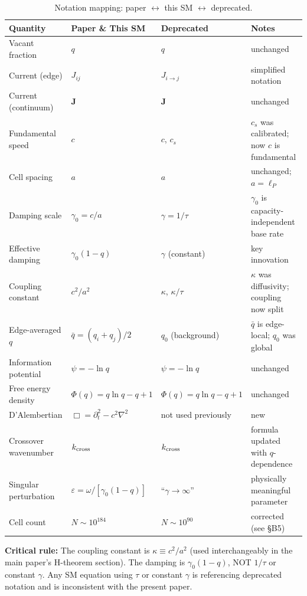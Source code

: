 \documentclass[reprint]{revtex4-2}
\begin{document}
\begin{table}[h]
\caption{Notation mapping: paper $\leftrightarrow$ this SM $\leftrightarrow$ deprecated.}
\label{tab:notation}
\begin{tabular}{llll}
\toprule
Quantity & Paper \& This SM & Deprecated & Notes \\
\midrule
Vacant fraction & $q$ & $q$ & unchanged \\
Current (edge) & $J_{ij}$ & $J_{i\to j}$ & simplified notation \\
Current (continuum) & $\mathbf{J}$ & $\mathbf{J}$ & unchanged \\
Fundamental speed & $c$ & $c$, $c_s$ & $c_s$ was calibrated; now $c$ is fundamental \\
Cell spacing & $a$ & $a$ & unchanged; $a=\ell_P$ \\
Damping scale & $\gamma_0 = c/a$ & $\gamma = 1/\tau$ & $\gamma_0$ is capacity-independent base rate \\
Effective damping & $\gamma_0(1-q)$ & $\gamma$ (constant) & key innovation \\
Coupling constant & $c^2/a^2$ & $\kappa$, $\kappa/\tau$ & $\kappa$ was diffusivity; coupling now split \\
Edge-averaged $q$ & $\bar{q} = (q_i+q_j)/2$ & $q_0$ (background) & $\bar{q}$ is edge-local; $q_0$ was global \\
Information potential & $\psi = -\ln q$ & $\psi = -\ln q$ & unchanged \\
Free energy density & $\Phi(q)=q\ln q - q + 1$ & $\Phi(q)=q\ln q - q + 1$ & unchanged \\
D'Alembertian & $\Box = \partial_t^2 - c^2\nabla^2$ & not used previously & new \\
Crossover wavenumber & $k_{\rm cross}$ & $k_{\rm cross}$ & formula updated with $q$-dependence \\
Singular perturbation & $\varepsilon = \omega/[\gamma_0(1-q)]$ & ``$\gamma\to\infty$'' & physically meaningful parameter \\
Cell count & $N \sim 10^{184}$ & $N \sim 10^{90}$ & corrected (see \S B5) \\
\bottomrule
\end{tabular}
\end{table}

\textbf{Critical rule:} The coupling constant is $\kappa\equiv c^2/a^2$ (used interchangeably in the main paper's H-theorem section). The damping is $\gamma_0(1-q)$, NOT $1/\tau$ or constant $\gamma$. Any SM equation using $\tau$ or constant $\gamma$ is referencing deprecated notation and is inconsistent with the present paper.
\end{document}
